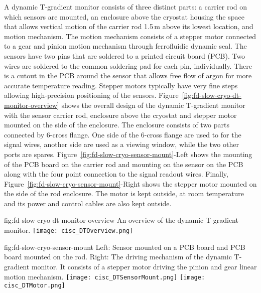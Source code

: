 A dynamic T-gradient monitor consists of three distinct parts: a carrier rod on which sensors are mounted, an enclosure above the cryostat housing the space that allows vertical motion of the carrier rod 1.5\,m above its lowest location, and motion mechanism. The motion mechanism consists of a stepper motor connected to a gear and pinion motion mechanism through ferrofluidic dynamic seal. The sensors have two pins that are soldered to a printed circuit board (PCB). Two wires are soldered to the common soldering pad for each pin, individually.   There is a cutout in the PCB around the sensor that allows free flow of argon for more accurate temperature reading.  Stepper motors typically have very fine steps allowing high-precision positioning of the sensors.  Figure~\ref{fig:fd-slow-cryo-dt-monitor-overview} shows the overall design of the dynamic T-gradient monitor with the sensor carrier rod, enclosure above the cryostat and stepper motor mounted on the side of the enclosure. The enclosure consists of two parts connected by 6-cross flange. One side of the 6-cross flange 
 are used to for the signal wires, another side are used as a viewing window, while the two other ports are spares. Figure~\ref{fig:fd-slow-cryo-sensor-mount}-Left shows the mounting of the PCB board on the carrier rod and mounting on the sensor on the PCB along with the four point connection to the signal readout wires. Finally, Figure~\ref{fig:fd-slow-cryo-sensor-mount}-Right shows the stepper motor mounted on the side of the rod enclosure. The motor is kept outside, at room temperature and its power and control cables are also kept outside.

\begin{dunefigure}{fig:fd-slow-cryo-dt-monitor-overview}
  {An overview of the dynamic T-gradient monitor.}
 \texttt{[image: cisc\_DTOverview.png]}
\end{dunefigure}
\begin{dunefigure}{fig:fd-slow-cryo-sensor-mount}
  {Left: Sensor mounted on a PCB board and PCB board mounted on the rod. Right:
    The driving mechanism of the dynamic T-gradient monitor. It consists of a stepper motor driving the pinion and gear linear motion mechanism. }
  \texttt{[image: cisc\_DTSensorMount.png]}
  \hspace{3cm}%
  \texttt{[image: cisc\_DTMotor.png]}
\end{dunefigure}

